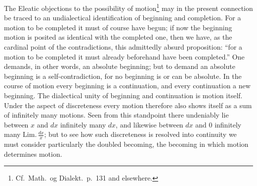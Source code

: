 \documentclass[12pt,a4paper]{book}
\begin{document}
The Eleatic objections to the possibility of motion\footnote{Cf.\ Math.\ og
Dialekt.\ p.~131 and elsewhere.} may in the present connection be traced to an
undialectical identification of beginning and completion. For a motion to be
completed it must of course have begun; if now the beginning motion is posited
as identical with the completed one, then we have, as the cardinal point of the
contradictions, this admittedly absurd proposition: ``for a motion to be
completed it must already beforehand have been completed.'' One demands, in
other words, an absolute beginning; but to demand an absolute beginning is a
self-contradiction, for no beginning is or can be absolute. In the course of
motion every beginning is a continuation, and every continuation a new
beginning. The dialectical unity of beginning and continuation is motion
itself. Under the aspect of discreteness every motion therefore also shows
itself as a sum of infinitely many motions. Seen from this standpoint there
undeniably lie between $x$ and $dx$ infinitely many $dx$, and likewise between
$dx$ and $0$ infinitely many $\mathrm{Lim.}\, \frac{dx}{x}$; but to see how
such discreteness is resolved into continuity we must consider particularly the
doubled becoming, the becoming in which motion determines motion.
\end{document}

